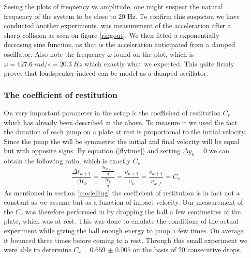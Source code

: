 \documentclass[12pt,oneside,a4paper]{article}
\numberwithin{equation}{section}
\begin{document}
{{{{Seeing the plots of frequency vs amplitude, one might suspect the natural frequency of the system to be close to 20 Hz. To confirm this suspicion we have conducted another experiments. was measurement of the acceleration after a sharp collision as seen on figure \ref{ringout}. We then fitted a exponentially deceasing sine function, as that is the acceleration anticipated from a damped oscillator. Also note the frequency $\omega$ found on the plot, which is $\omega = \SI{127.6}{rad/s} = \SI{20.3}{Hz}$ which exactly what we expected. This quite firmly proves that loudspeaker indeed can be model as a damped oscillator.

\subsubsection{The coefficient of restitution}
On very important parameter in the setup is the coefficient of restitution $C_r$ which has already been described in the above. To measure it we used the fact the duration of each jump on a plate at rest is proportional to the initial velocity. Since the jump the will be symmetric the initial and final velocity will be equal but with opposite signs. By equation (\ref{flytime}) and setting $\Delta y_k=0$ we can obtain the following ratio, which is exactly $C_r$.
\begin{equation}
	\frac{\Delta t_{k+1}}{\Delta t_{k}}= \frac{\frac{2v_{k+1}}{g}}{\frac{2v_{k}}{g}} = \frac{v_{k+1}}{v_k} = \frac{v_{k+1}}{v_{k,f}} = C_r
\end{equation}
As mentioned in section \ref{modelling} the coefficient of restitution is in fact not a constant as we assume but as a function of impact velocity. Our measurement of the $C_r$ was therefore performed in by dropping the ball a few centimetres of the plate, which was at rest. This was done to emulate the conditions of the actual experiment while giving the ball enough energy to jump a few times. On average it bounced three times before coming to a rest. Through this small experiment we were able to determine $C_r= \num{0.659(5)}$ on the basis of 20 consecutive drops. 

}}}}
\end{document}
